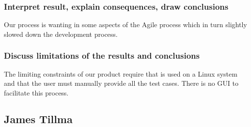 \subsubsection{Interpret result, explain consequences, draw conclusions}
Our process is wanting in some aspects of the Agile process which in turn slightly slowed down the development process.

\subsubsection{Discuss limitations of the results and conclusions}
The limiting constraints of our product require that is used on a Linux system and that the user must manually provide all the test cases. There is no GUI to facilitate this process.


\subsection{James Tillma}


